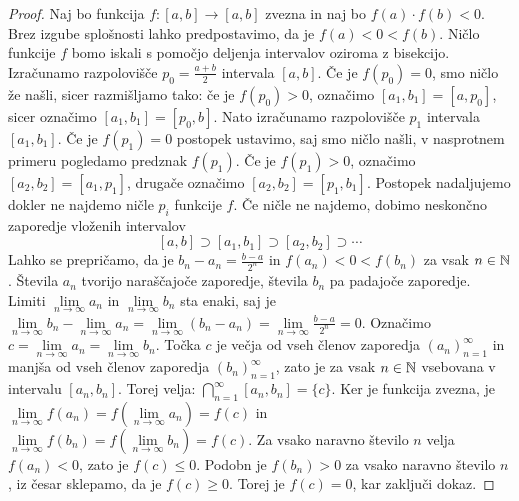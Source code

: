 \documentclass[../TG_magistrsko_delo_sections.tex]{subfiles}
\begin{document}
\begin{proof}
Naj bo funkcija $f:[a, b] \to [a, b]$ zvezna in naj bo $f(a)\cdot f(b) < 0$. Brez izgube splošnosti lahko predpostavimo, da je $f(a) < 0 < f(b)$. Ničlo funkcije $f$ bomo iskali s pomočjo deljenja intervalov oziroma z bisekcijo. Izračunamo razpolovišče $p_0=\frac{a+b}{2}$ intervala $[a, b]$. Če je $f(p_0)=0$, smo ničlo že našli, sicer razmišljamo tako: če je $f(p_0) >0$, označimo $[a_1, b_1] =  [a, p_0]$, sicer označimo $[a_1, b_1] =  [p_0, b]$. Nato izračunamo razpolovišče $p_1$ intervala $[a_1, b_1]$. Če je $f(p_1)=0$ postopek ustavimo, saj smo ničlo našli, v nasprotnem primeru pogledamo predznak $f(p_1)$. Če je $f(p_1) >0$, označimo $[a_2, b_2] =  [a_1, p_1]$, drugače označimo $[a_2, b_2] =  [p_1, b_1]$. Postopek nadaljujemo dokler ne najdemo ničle $p_i$ funkcije $f$. Če ničle ne najdemo, dobimo neskončno zaporedje vloženih intervalov 
$$ [a, b] \supset [a_1, b_1] \supset [a_2, b_2] \supset \cdots$$
Lahko se prepričamo, da je $b_n - a_n = \frac{b-a}{2^n}$ in $f(a_n)<0<f(b_n)$ za vsak $n\in \mathbb N$. Števila $a_n$ tvorijo naraščajoče zaporedje, števila $b_n$ pa padajoče zaporedje.  Limiti $\lim\limits_{n \to \infty} a_n$ in $\lim\limits_{n \to \infty} b_n$ sta enaki, saj je 
$\lim\limits_{n \to \infty} b_n - \lim\limits_{n \to \infty} a_n = \lim\limits_{n \to \infty} (b_n - a_n) = \lim\limits_{n \to \infty} \frac{b - a}{2^n} = 0$. Označimo $c = \lim\limits_{n \to \infty} a_n = \lim\limits_{n \to \infty} b_n$. Točka $c$ je večja od vseh členov zaporedja $\left(a_n \right)_{n=1}^{\infty}$ in manjša od vseh členov zaporedja $\left(b_n \right)_{n=1}^{\infty}$, zato je za vsak $n \in \mathbb N$ vsebovana v intervalu $[a_n, b_n]$. Torej velja:
$\bigcap\limits_{n=1}^{\infty} [a_n, b_n] = \{c\}$. 
Ker je funkcija zvezna, je 
$\lim\limits_{n \to \infty} f(a_n) = f\left(\lim\limits_{n \to \infty} a_n\right) = f(c)$
in 
$\lim\limits_{n \to \infty} f(b_n) = f\left(\lim\limits_{n \to \infty} b_n\right) = f(c)$.
Za vsako naravno število $n$ velja $f(a_n) <0$, zato je $f(c) \leq 0$. Podobn je $f(b_n) > 0$ za vsako naravno število $n$, iz česar sklepamo, da je $f(c) \geq 0$. Torej je $f(c) = 0$, kar zaključi dokaz.
\end{proof}
\end{document}
